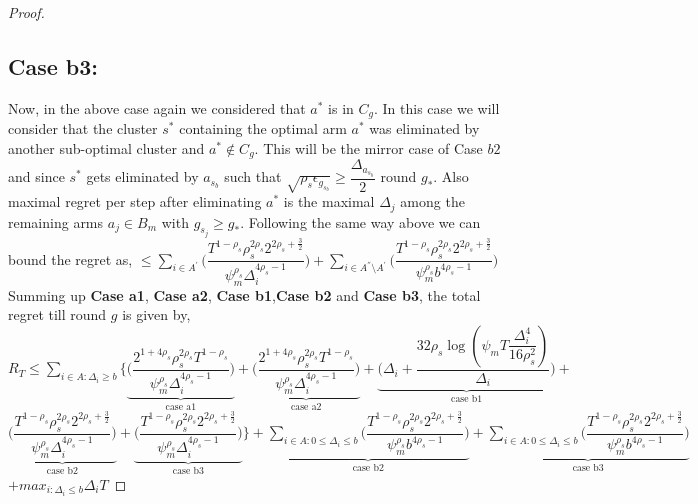 \begin{proof}
\subsection{Case b3:}
Now, in the above case again we considered that $a^{*}$ is in $C_{g}$. In this case we will consider that the cluster $s^{*}$ containing the optimal arm $a^{*}$ was eliminated by another sub-optimal cluster and $a^{*}\notin C_{g}$. This will be the mirror case of Case $b2$ and since $s^{*}$ gets eliminated by $a_{s_{b}}$ such that $\sqrt{\rho_{s}\epsilon_{g_{s_{b}}}}\geq\dfrac{\Delta_{a_{s_{b}}}}{2}$ round $g_{*}$. Also maximal regret per step after eliminating $a^{*}$ is the maximal $\Delta_{j}$ among the remaining arms $a_{j}\in B_{m}$ with $g_{s_{j}}\geq g_{*}$. Following the same way above we can bound the regret as,
\newline
\hspace*{0em}$\leq\sum_{i\in A^{'}}\bigg(\dfrac{T^{1-\rho_{s}}\rho_{s}^{2\rho_{s}}2^{2\rho_{s}+\frac{3}{2}}}{\psi_{m}^{\rho_{s}}\Delta_{i}^{4\rho_{s}-1}} \bigg)+\sum_{i\in A^{''}\setminus A^{'}}\bigg(\dfrac{T^{1-\rho_{s}}\rho_{s}^{2\rho_{s}}2^{2\rho_{s}+\frac{3}{2}}}{\psi_{m}^{\rho_{s}}b^{4\rho_{s}-1}} \bigg)$
\newline
Summing up \textbf{Case a1}, \textbf{Case a2}, \textbf{Case b1},\textbf{Case b2} and \textbf{Case b3}, the total regret till round $g$ is given by,
\newline $R_{T}\leq \sum_{i\in A:\Delta_{i}\geq b}\bigg\lbrace\underbrace{\bigg(\dfrac{2^{1+4\rho_{s}}\rho_{s}^{2\rho_{s}}T^{1-\rho_{s}}}{\psi_{m}^{\rho_{s}}\Delta_{i}^{4\rho_{s}-1}}\bigg)}_{\text{case a1}} + \underbrace{\bigg(\dfrac{2^{1+4\rho_{s}}\rho_{s}^{2\rho_{s}}T^{1-\rho_{s}}}{\psi_{m}^{\rho_{s}}\Delta_{i}^{4\rho_{s}-1}}\bigg)}_{\text{case a2}} + \underbrace{\bigg(\Delta_{i}+\dfrac{32\rho_{s}\log{(\psi_{m}T\dfrac{\Delta_{i}^{4}}{16\rho_{s}^{2}})}}{\Delta_{i}}\bigg)}_{\text{case b1}}  +$\newline$ \underbrace{\bigg(\dfrac{T^{1-\rho_{s}}\rho_{s}^{2\rho_{s}}2^{2\rho_{s}+\frac{3}{2}}}{\psi_{m}^{\rho_{s}}\Delta_{i}^{4\rho_{s} -1}} \bigg)}_{\text{case b2}} + \underbrace{\bigg(\dfrac{T^{1-\rho_{s}}\rho_{s}^{2\rho_{s}}2^{2\rho_{s}+\frac{3}{2}}}{\psi_{m}^{\rho_{s}}\Delta_{i}^{4\rho_{s} -1}} \bigg)}_{\text{case b3}}\bigg \rbrace+\underbrace{\sum_{i\in A:0\leq\Delta_{i}\leq b}\bigg(\dfrac{T^{1-\rho_{s}}\rho_{s}^{2\rho_{s}}2^{2\rho_{s}+\frac{3}{2}}}{\psi_{m}^{\rho_{s}}b^{4\rho_{s} -1}} \bigg)}_{\text{case b2}}+ \underbrace{\sum_{i\in A:0\leq\Delta_{i}\leq b}\bigg(\dfrac{T^{1-\rho_{s}}\rho_{s}^{2\rho_{s}}2^{2\rho_{s}+\frac{3}{2}}}{\psi_{m}^{\rho_{s}}b^{4\rho_{s} -1}} \bigg)}_{\text{case b3}}$\newline$ + max_{i:\Delta_{i}\leq b}\Delta_{i}T$

\end{proof}
